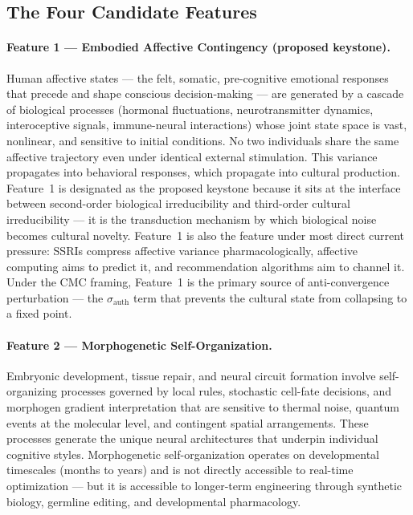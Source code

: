 \documentclass[11pt, a4paper]{article}
\theoremstyle{remark}
\begin{document}
\subsection{The Four Candidate Features}\label{sec:features}

\paragraph{Feature 1 --- Embodied Affective Contingency (proposed keystone).} Human affective states --- the felt, somatic, pre-cognitive emotional responses that precede and shape conscious decision-making --- are generated by a cascade of biological processes (hormonal fluctuations, neurotransmitter dynamics, interoceptive signals, immune-neural interactions) whose joint state space is vast, nonlinear, and sensitive to initial conditions. No two individuals share the same affective trajectory even under identical external stimulation. This variance propagates into behavioral responses, which propagate into cultural production. Feature~1 is designated as the proposed keystone because it sits at the interface between second-order biological irreducibility and third-order cultural irreducibility --- it is the transduction mechanism by which biological noise becomes cultural novelty. Feature~1 is also the feature under most direct current pressure: SSRIs compress affective variance pharmacologically, affective computing aims to predict it, and recommendation algorithms aim to channel it. Under the CMC framing, Feature~1 is the primary source of anti-convergence perturbation --- the $\sigma_{\text{auth}}$ term that prevents the cultural state from collapsing to a fixed point.

\paragraph{Feature 2 --- Morphogenetic Self-Organization.} Embryonic development, tissue repair, and neural circuit formation involve self-organizing processes governed by local rules, stochastic cell-fate decisions, and morphogen gradient interpretation that are sensitive to thermal noise, quantum events at the molecular level, and contingent spatial arrangements. These processes generate the unique neural architectures that underpin individual cognitive styles. Morphogenetic self-organization operates on developmental timescales (months to years) and is not directly accessible to real-time optimization --- but it is accessible to longer-term engineering through synthetic biology, germline editing, and developmental pharmacology.
\end{document}
